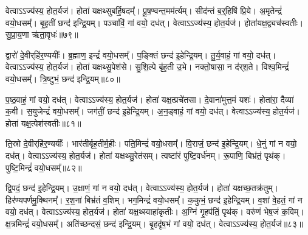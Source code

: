 वेत्वा\-ऽ\-ऽ\-ज्य॑स्य॒ होत॒र्यज॑।
होता॑ यक्षथ्सुबर्\mbox{}हि॒षदम्᳚।
पू॒ष॒ण्वन्त॒मम॑र्त्यम्।
सीद॑न्तं ब॒र्॒हिषि॑ प्रि॒ये।
अ॒मृतेन्द्रं॑ वयो॒धसम्᳚।
बृ॒ह॒तीं छन्द॑ इन्द्रि॒यम्।
पञ्चा॑विं॒ गां वयो॒ दध॑त्।
वेत्वा\-ऽ\-ऽ\-ज्य॑स्य॒ होत॒र्यज॑।
होता॑यक्ष॒द्व्यच॑स्वतीः।
सु॒प्रा॒य॒णा ऋ॑ता॒वृधः॑॥७९॥

द्वारो॑ दे॒वीर्‌\mbox{}हि॑र॒ण्ययीः᳚।
ब्र॒ह्माण॒ इन्द्रं॑ वयो॒धसम्᳚।
प॒ङ्क्तिं छन्द॑ इ॒हेन्द्रि॒यम्।
तु॒र्य॒वाहं॒ गां वयो॒ दध॑त्।
वेत्वा\-ऽ\-ऽ\-ज्य॑स्य॒ होत॒र्यज॑।
होता॑ यक्षथ्सु॒पेश॑से।
सु॒शि॒ल्पे बृ॑ह॒ती उ॒भे।
नक्तो॒षासा॒ न द॑र्‌\mbox{}श॒ते।
विश्व॒मिन्द्रं॑ वयो॒धसम्᳚।
त्रि॒ष्टुभं॒ छन्द॑ इन्द्रि॒यम्॥८०॥

प॒ष्ठ॒वाहं॒ गां वयो॒ दध॑त्।
वेत्वा\-ऽ\-ऽ\-ज्य॑स्य॒ होत॒र्यज॑।
होता॑ यक्ष॒त्प्रचे॑तसा।
दे॒वाना॑मुत्त॒मं यशः॑।
होता॑रा॒ दैव्या॑ क॒वी।
स॒युजेन्द्रं॑ वयो॒धसम्᳚।
जग॑तीं॒ छन्द॑ इ॒हेन्द्रि॒यम्।
अ॒न॒ड्वाहं॒ गां वयो॒ दध॑त्।
वेत्वा\-ऽ\-ऽ\-ज्य॑स्य॒ होत॒र्यज॑।
होता॑ यक्ष॒त्पेश॑स्वतीः॥८१॥

ति॒स्रो दे॒वीर्‌\mbox{}हि॑र॒ण्ययीः᳚।
भार॑तीर्बृह॒तीर्म॒हीः।
पति॒मिन्द्रं॑ वयो॒धसम्᳚।
वि॒राजं॒ छन्द॑ इ॒हेन्द्रि॒यम्।
धे॒नुं गां न वयो॒ दध॑त्।
वेत्वा\-ऽ\-ऽ\-ज्य॑स्य॒ होत॒र्यज॑।
होता॑ यक्षथ्सु॒रेत॑सम्।
त्वष्टा॑रं पुष्टि॒वर्ध॑नम्।
रू॒पाणि॒ बिभ्र॑तं॒ पृथ॑क्।
पुष्टि॒मिन्द्रं॑ वयो॒धसम्᳚॥८२॥

द्वि॒पदं॒ छन्द॑ इ॒हेन्द्रि॒यम्।
उ॒क्षाणं॒ गां न वयो॒ दध॑त्।
वेत्वा\-ऽ\-ऽ\-ज्य॑स्य॒ होत॒र्यज॑।
होता॑ यक्षच्छ॒तक्र॑तुम्।
हिर॑ण्य\-पर्ण\-मु॒क्थिनम्᳚।
र॒श॒नां बिभ्र॑तं व॒शिम्।
भग॒मिन्द्रं॑ वयो॒धसम्᳚।
क॒कुभं॒ छन्द॑ इ॒हेन्द्रि॒यम्।
व॒शां वे॒हतं॒ गां न वयो॒ दध॑त्।
वेत्वा\-ऽ\-ऽ\-ज्य॑स्य॒ होत॒र्यज॑।
होता॑ यक्ष॒थ्स्वाहा॑कृतीः।
अ॒ग्निं गृ॒हप॑तिं॒ पृथ॑क्।
वरु॑णं भेष॒जं क॒विम्।
क्ष॒त्रमिन्द्रं॑ वयो॒धसम्᳚।
अति॑च्छन्दसं॒ छन्द॑ इन्द्रि॒यम्।
बृ॒हदृ॑ष॒भं गां वयो॒ दध॑त्।
वेत्वा\-ऽ\-ऽ\-ज्य॑स्य॒ होत॒र्यज॑॥८३॥

